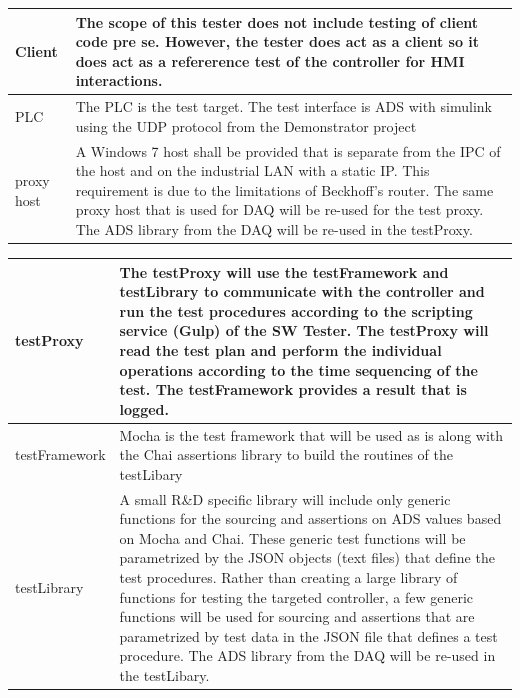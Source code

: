 \documentclass[11pt,english,twoside]{extarticle}
\begin{document}
\begin{tabular}{|p{2.5cm}|p{12cm}|} \hline 
Client & The scope of this tester does not include testing of client code pre se. However, the tester does act as a client so it does act as a refererence test of the controller for HMI interactions.\\ \hline
PLC & The PLC is the test target. The test interface is ADS with simulink using the UDP protocol from the Demonstrator project \\ \hline
proxy host & A Windows 7 host shall be provided that is separate from the IPC of the host and on the industrial LAN with a static IP. This requirement is due to the limitations of Beckhoff's router. The same proxy host that is used for DAQ will be re-used for the test proxy. The ADS library from the DAQ will be re-used in the testProxy.\\ \hline
\end{tabular}


\begin{tabular}{|p{2.5cm}|p{12cm}|} \hline 
testProxy & The testProxy will use the testFramework and testLibrary to communicate with the controller and run the test procedures according to the scripting service (Gulp) of the SW Tester. The testProxy will read the test plan and perform the individual operations according to the time sequencing of the test. The testFramework provides a result that is logged. \\ \hline
 testFramework &  Mocha is the test framework that will be used as is along with the Chai assertions library to build the routines of the testLibary\\ \hline
testLibrary & A small R\&D specific library will include only generic functions for the sourcing and assertions on ADS values based on Mocha and Chai.  These generic test functions will be parametrized by the JSON objects (text files) that define the test procedures. Rather than creating a large library of functions for testing the targeted controller, a few generic functions will be used for sourcing and assertions that are parametrized by test data in the JSON file that defines a test procedure. The ADS library from the DAQ will be re-used in the testLibary. \\ \hline
\end{tabular}
\end{document}
